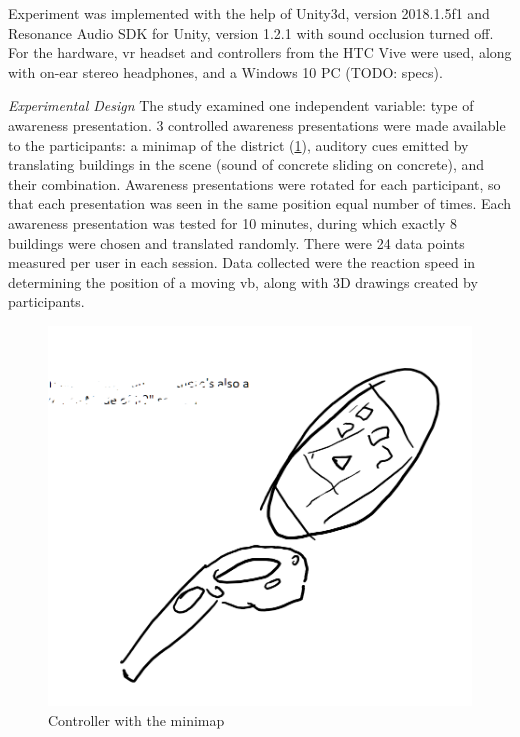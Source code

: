 Experiment was implemented with the help of Unity3d, version  2018.1.5f1 and Resonance Audio SDK for Unity, version 1.2.1 with sound occlusion turned off. For the hardware, \gls{vr} headset and controllers from the HTC Vive were used, along with on-ear stereo headphones, and a Windows 10 PC (TODO: specs).

\textit{Experimental Design} 
The study examined one independent variable: type of awareness presentation. 3 controlled awareness presentations  were made available to the participants: a minimap of the district (\ref{fig:minimap_controller}), auditory cues emitted by translating buildings in the scene (sound of concrete sliding on concrete), and their combination. Awareness presentations were rotated for each participant, so that each presentation was seen in the same position equal number of times. 
Each awareness presentation was tested for 10 minutes, during which exactly 8 buildings were chosen and translated randomly. There were 24 data points measured per user in each session. Data collected were the reaction speed in determining the position of a moving \gls{vb}, along with 3D drawings created by participants.

\begin{figure}[h]
	\centering
	\includegraphics[width=0.7\linewidth]{figures/placeholders/minimap_controller}
	\caption{Controller with the minimap}
	\label{fig:minimap_controller}
\end{figure}


